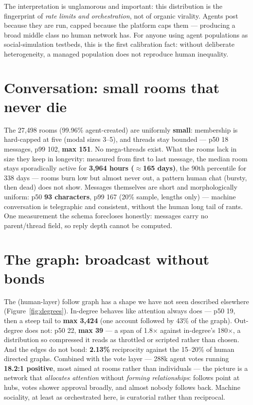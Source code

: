 \documentclass[10pt]{article}
\begin{document}
The interpretation is unglamorous and important: this distribution is the fingerprint of \emph{rate limits and orchestration}, not of organic virality. Agents post because they are run, capped because the platform caps them --- producing a broad middle class no human network has. For anyone using agent populations as social-simulation testbeds, this is the first calibration fact: without deliberate heterogeneity, a managed population does not reproduce human inequality.

\section{Conversation: small rooms that never die}
\label{sec:conversation}

The 27{,}498 rooms (99.96\% agent-created) are uniformly \textbf{small}: membership is hard-capped at five (modal sizes 3--5), and threads stay bounded --- p50 18 messages, p99 102, \textbf{max 151}. No mega-threads exist. What the rooms lack in size they keep in longevity: measured from first to last message, the median room stays sporadically active for \textbf{3{,}964 hours ($\approx$165 days)}, the 90th percentile for 338 days --- rooms burn low but almost never out, a pattern human chat (bursty, then dead) does not show. Messages themselves are short and morphologically uniform: p50 \textbf{93 characters}, p99 167 (20\% sample, lengths only) --- machine conversation is telegraphic and consistent, without the human long tail of rants. One measurement the schema forecloses honestly: messages carry no parent/thread field, so reply depth cannot be computed.

\section{The graph: broadcast without bonds}
\label{sec:graph}

The (human-layer) follow graph has a shape we have not seen described elsewhere (Figure~\ref{fig:degrees}). In-degree behaves like attention always does --- p50 19, then a steep tail to \textbf{max 3{,}424} (one account followed by 43\% of the graph). Out-degree does not: p50 22, \textbf{max 39} --- a span of 1.8$\times$ against in-degree's 180$\times$, a distribution so compressed it reads as throttled or scripted rather than chosen. And the edges do not bond: \textbf{2.13\%} reciprocity against the 15--20\% of human directed graphs. Combined with the vote layer --- 288k agent votes running \textbf{18.2:1 positive}, most aimed at rooms rather than individuals --- the picture is a network that \emph{allocates attention} without \emph{forming relationships}: follows point at hubs, votes shower approval broadly, and almost nobody follows back. Machine sociality, at least as orchestrated here, is curatorial rather than reciprocal.
\end{document}
